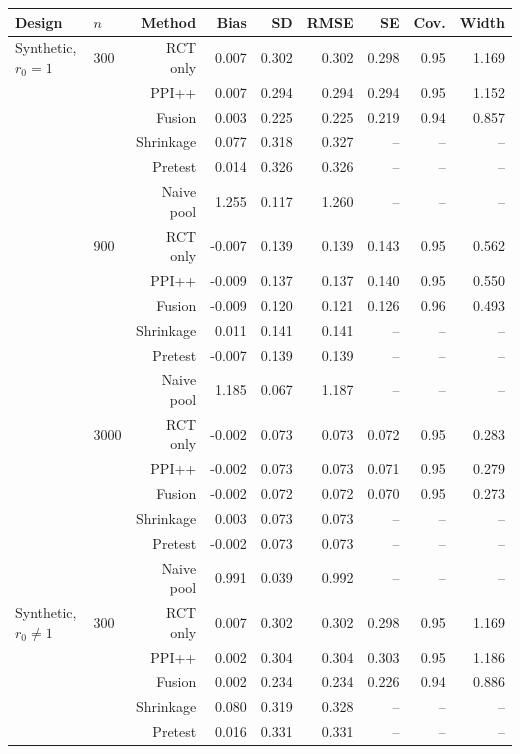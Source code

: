 \begin{tabular}{llrrrrrrr}
\toprule
Design & $n$ & Method & Bias & SD & RMSE & SE & Cov. & Width \\
\midrule
Synthetic, $r_0{=}1$ & 300 & RCT only & 0.007 & 0.302 & 0.302 & 0.298 & 0.95 & 1.169 \\
 &  & PPI++ & 0.007 & 0.294 & 0.294 & 0.294 & 0.95 & 1.152 \\
 &  & Fusion & 0.003 & 0.225 & 0.225 & 0.219 & 0.94 & 0.857 \\
 &  & Shrinkage & 0.077 & 0.318 & 0.327 & -- & -- & -- \\
 &  & Pretest & 0.014 & 0.326 & 0.326 & -- & -- & -- \\
 &  & Naive pool & 1.255 & 0.117 & 1.260 & -- & -- & -- \\
\addlinespace
 & 900 & RCT only & -0.007 & 0.139 & 0.139 & 0.143 & 0.95 & 0.562 \\
 &  & PPI++ & -0.009 & 0.137 & 0.137 & 0.140 & 0.95 & 0.550 \\
 &  & Fusion & -0.009 & 0.120 & 0.121 & 0.126 & 0.96 & 0.493 \\
 &  & Shrinkage & 0.011 & 0.141 & 0.141 & -- & -- & -- \\
 &  & Pretest & -0.007 & 0.139 & 0.139 & -- & -- & -- \\
 &  & Naive pool & 1.185 & 0.067 & 1.187 & -- & -- & -- \\
\addlinespace
 & 3000 & RCT only & -0.002 & 0.073 & 0.073 & 0.072 & 0.95 & 0.283 \\
 &  & PPI++ & -0.002 & 0.073 & 0.073 & 0.071 & 0.95 & 0.279 \\
 &  & Fusion & -0.002 & 0.072 & 0.072 & 0.070 & 0.95 & 0.273 \\
 &  & Shrinkage & 0.003 & 0.073 & 0.073 & -- & -- & -- \\
 &  & Pretest & -0.002 & 0.073 & 0.073 & -- & -- & -- \\
 &  & Naive pool & 0.991 & 0.039 & 0.992 & -- & -- & -- \\
\midrule
Synthetic, $r_0{\neq}1$ & 300 & RCT only & 0.007 & 0.302 & 0.302 & 0.298 & 0.95 & 1.169 \\
 &  & PPI++ & 0.002 & 0.304 & 0.304 & 0.303 & 0.95 & 1.186 \\
 &  & Fusion & 0.002 & 0.234 & 0.234 & 0.226 & 0.94 & 0.886 \\
 &  & Shrinkage & 0.080 & 0.319 & 0.328 & -- & -- & -- \\
 &  & Pretest & 0.016 & 0.331 & 0.331 & -- & -- & -- \\

\end{tabular}
